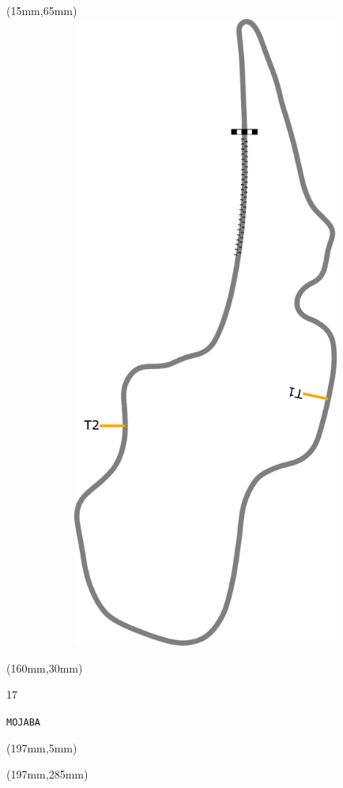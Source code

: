 \begin{textblock*}{185mm}(15mm,65mm)%
\centering
\mbox{\includegraphics[width=185mm,height=210mm,keepaspectratio]{PT/MOJABA.pdf}}
\end{textblock*}
\begin{textblock*}{40mm}(160mm,30mm)%
\Large
\par{} 
\par17 
\par\hfill\tiny\tt MOJABA\\
\end{textblock*}
\begin{textblock*}{20mm}(197mm,5mm)%
\fbox{\thepage}
\label{MOJABA}
\end{textblock*}
\begin{textblock*}{20mm}(197mm,285mm)%
\fbox{\thepage}
\end{textblock*}

